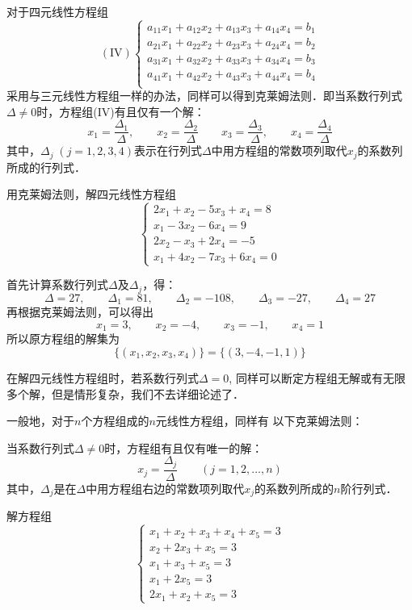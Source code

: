 对于四元线性方程组
\[(\text{IV})\begin{cases}
    a_{11}x_1 +a_{12}x_2 +a_{13}x_3 +a_{14}x_4=b_1\\
    a_{21}x_1 +a_{22}x_2 +a_{23}x_3 +a_{24}x_4=b_2\\
    a_{31}x_1 +a_{32}x_2 +a_{33}x_3 +a_{34}x_4=b_3\\
    a_{41}x_1 +a_{42}x_2 +a_{43}x_3 +a_{44}x_4=b_4\\
\end{cases}\]
采用与三元线性方程组一样的办法，同样可以得到克莱姆法则．即当系数行列式$\Delta \ne 0$时，方程组(IV)有且仅有一个解：
\[x_1=\frac{\Delta_1}{\Delta},\qquad x_2=\frac{\Delta_2}{\Delta}\qquad x_3=\frac{\Delta_3}{\Delta},\qquad x_4=\frac{\Delta_4}{\Delta}\]
其中，$\Delta_j\; (j=1, 2, 3, 4)$表示在行列式$\Delta$中用方程组的常数项列取代$x_j$的系数列所成的行列式．

\begin{example}
    用克莱姆法则，解四元线性方程组
\[\begin{cases}
    2x_1+x_2-5x_3+x_4=8\\
    x_1-3x_2-6x_4=9\\
    2x_2-x_3+2x_4=-5\\
    x_1+4x_2-7x_3+6x_4=0
\end{cases}\]
\end{example}

\begin{solution}
首先计算系数行列式$\Delta$及$\Delta_j$，得：
\[\Delta=27,\qquad \Delta_1=81,\qquad \Delta_2=-108,\qquad \Delta_3=-27,\qquad \Delta_4=27\]
再根据克莱姆法则，可以得出
\[x_1=3,\qquad x_2=-4,\qquad x_3=-1,\qquad x_4=1\]
所以原方程组的解集为
\[\{(x_1,x_2,x_3,x_4)\}=\{(3,-4,-1,1)\}\]
\end{solution}

在解四元线性方程组时，若系数行列式$\Delta=0$, 同样可以断定方程组无解或有无限多个解，但是情形复杂，我们不去详细论述了．

一般地，对于$n$个方程组成的$n$元线性方程组，同样有
以下克莱姆法则：

当系数行列式$\Delta\ne 0$时，方程组有且仅有唯一的解：
\[x_j=\frac{\Delta_j}{\Delta}\qquad  (j=1,2,\ldots,n)\]
其中，$\Delta_j$是在$\Delta$中用方程组右边的常数项列取代$x_j$的系数列所成的$n$阶行列式．


\begin{example}
    解方程组
\[\begin{cases}
    x_1+x_2+x_3+x_4+x_5=3\\
    x_2+2x_3+x_5=3\\
    x_1+x_3+x_5=3\\
    x_1+2x_5=3\\
    2x_1+x_2+x_5=3
\end{cases}\]
\end{example}


